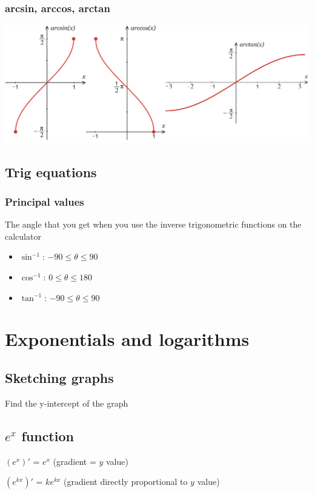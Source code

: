 \documentclass[A4paper]{article}
\begin{document}
	\subsubsection{arcsin, arccos, arctan}
	\includegraphics[scale=0.7]{arcsincostan}
	
	\subsection{Trig equations}
	\subsubsection{Principal values}
	The angle that you get when you use the inverse trigonometric functions on the calculator
	\begin{itemize}
		\item $\sin^{-1}$: $-90\leq\theta\leq90$
		\item $\cos^{-1}$: $0\leq\theta\leq180$
		\item $\tan^{-1}$: $-90\leq\theta\leq90$
	\end{itemize}
	
	\pagebreak

	\section{Exponentials and logarithms}
	\subsection{Sketching graphs}
	Find the y-intercept of the graph

	\subsection{$e^x$ function}
	\begin{description}
		\item $(e^x)'$ = $e^x$ (gradient = $y$ value)
		\item $(e^{kx})'$ = $ke^{kx}$ (gradient directly proportional to $y$ value)
	\end{description}
\end{document}
